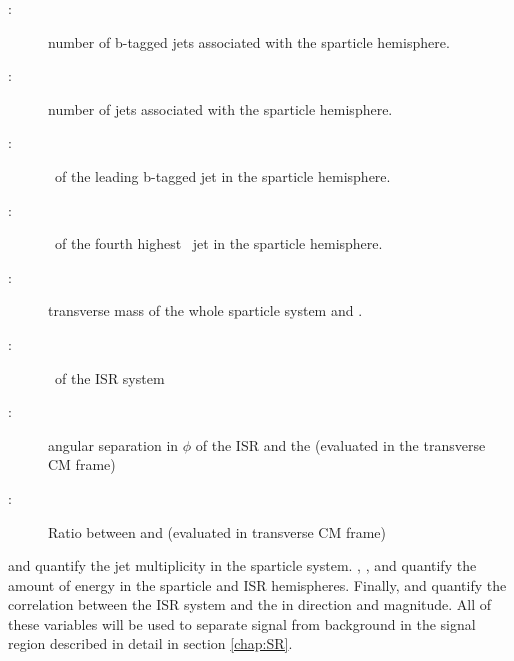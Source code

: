 \begin{description}
\item [\boldmath \NbV:] number of b-tagged jets associated with the sparticle hemisphere.
\item [\boldmath \NjV:] number of jets associated with the sparticle hemisphere.
\item [\boldmath \pTSBZero:] \pt\ of the leading b-tagged jet in the sparticle hemisphere.
\item [\boldmath \pTjV:] \pt\ of the fourth highest \pt\ jet in the sparticle hemisphere.
\item [\boldmath \MS:] transverse mass of the whole sparticle system and \met.
\item [\boldmath \PTISR:] \pt\ of the ISR system
\item [\boldmath \dphiISRI:] angular separation in $\phi$ of the ISR and the \met (evaluated in the transverse CM frame)
\item [\boldmath \RISR:] Ratio between \met and \PTISR (evaluated in transverse CM frame)
\end{description}

\NjV and \NbV quantify the jet multiplicity in the sparticle system.  \pTSBZero, \pTjV, \MS and \PTISR quantify the amount of energy in the sparticle and ISR hemispheres.  Finally, \dphiISRI and \RISR quantify the correlation between the ISR system and the \MET in direction and magnitude.  All of these variables will be used to separate signal from background in the signal region described in detail in section \ref{chap:SR}.

